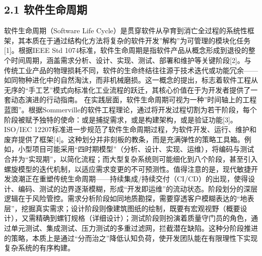 \subsection{2.1 软件生命周期}\label{ux8f6fux4ef6ux751fux547dux5468ux671f} 软件生命周期（Software Life Cycle）是贯穿软件从孕育到消亡全过程的系统性框架，其本质在于通过结构化方法将复杂的软件开发''解构''为可管理的模块化任务{[}1{]}。根据IEEE Std 1074标准，软件生命周期是指软件产品从概念形成到退役的整个时间周期，涵盖需求分析、设计、实现、测试、部署和维护等关键阶段{[}2{]}。与传统工业产品的物理损耗不同，软件的生命终结往往源于技术迭代或功能冗余------如同物种进化中的自然淘汰，而非机械磨损。这一概念的提出，标志着软件工程从无序的``手工艺''模式向标准化工业流程的跃迁，其核心价值在于为开发者提供了一套动态演进的行动指南。 在实践层面，软件生命周期可视为一种''时间轴上的工程蓝图''。根据Sommerville的软件工程理论，通过将开发过程切割为若干阶段，每个阶段被赋予独特的使命：或是捕捉需求，或是构建架构，或是验证功能{[}3{]}。ISO/IEC 12207标准进一步规范了软件生命周期过程，为软件开发、运行、维护和废弃提供了框架{[}4{]}。这种划分并非刻板的教条，而是充满弹性的策略工具箱。例如，小型项目可能采用``四时期模型''（分析、设计、实现、运维），将编码与测试合并为``实现期''，以简化流程；而大型复杂系统则可能细化到八个阶段，甚至引入螺旋模型的迭代机制，以适应需求变更的不可预测性。值得注意的是，现代敏捷开发浪潮正在重塑传统生命周期------持续集成/持续交付（CI/CD）的出现，使得设计、编码、测试的边界逐渐模糊，形成``开发即运维''的流动状态。阶段划分的深层逻辑在于风险管控。需求分析阶段如同地质勘探，需要穿透客户模糊表达的``地表层''，挖掘真实需求；设计阶段则像建筑图纸的绘制，既要有宏观视野（概要设计），又需精确到螺钉规格（详细设计）；测试阶段则扮演着质量守门员的角色，通过单元测试、集成测试、压力测试的多重过滤网，拦截潜在缺陷。这种分阶段推进的策略，本质上是通过``分而治之''降低认知负荷，使开发团队能在有限理性下实现复杂系统的有序构建。 